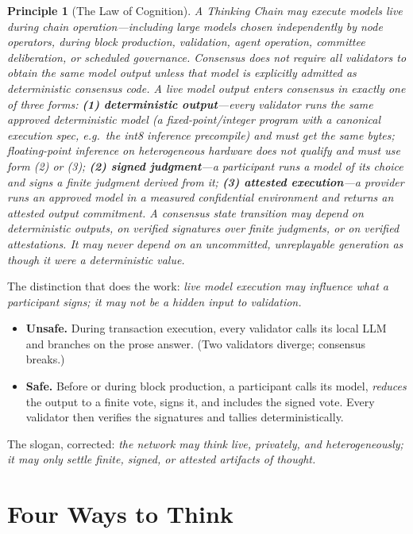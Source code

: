 \documentclass[11pt]{article}
\newtheorem{principle}{Principle}
\begin{document}
\begin{principle}[The Law of Cognition]
\label{prin:law}
A Thinking Chain may execute models live during chain operation---including large models chosen independently by node operators, during block production, validation, agent operation, committee deliberation, or scheduled governance. Consensus does \emph{not} require all validators to obtain the same model output unless that model is explicitly admitted as deterministic consensus code. A live model output enters consensus in exactly one of three forms: \textbf{(1) deterministic output}---every validator runs the same approved \emph{deterministic} model (a fixed-point/integer program with a canonical execution spec, e.g.\ the int8 inference precompile) and must get the same bytes; floating-point inference on heterogeneous hardware does \emph{not} qualify and must use form (2) or (3); \textbf{(2) signed judgment}---a participant runs a model of its choice and signs a finite judgment derived from it; \textbf{(3) attested execution}---a provider runs an approved model in a measured confidential environment and returns an attested output commitment. A consensus state transition may depend on deterministic outputs, on verified signatures over finite judgments, or on verified attestations. It may never depend on an uncommitted, unreplayable generation as though it were a deterministic value.
\end{principle}

The distinction that does the work: \emph{live model execution may influence what a participant signs; it may not be a hidden input to validation.}
\begin{itemize}[leftmargin=1.4em]
\item \textbf{Unsafe.} During transaction execution, every validator calls its local LLM and branches on the prose answer. (Two validators diverge; consensus breaks.)
\item \textbf{Safe.} Before or during block production, a participant calls its model, \emph{reduces} the output to a finite vote, signs it, and includes the signed vote. Every validator then verifies the signatures and tallies deterministically.
\end{itemize}
The slogan, corrected: \emph{the network may think live, privately, and heterogeneously; it may only settle finite, signed, or attested artifacts of thought.}

\section{Four Ways to Think}
\end{document}
